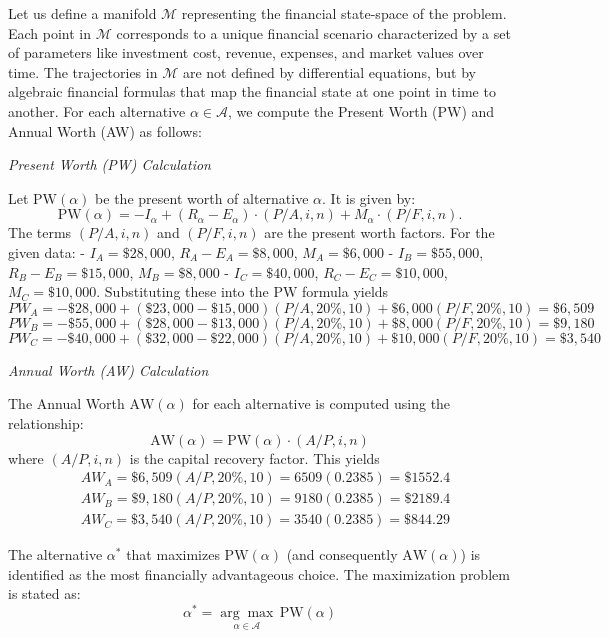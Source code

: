 \documentclass[12pt]{article}
\begin{document}
Let us define a manifold \(\mathcal{M}\) representing the financial state-space of the problem. Each point in \(\mathcal{M}\) corresponds to a unique financial scenario characterized by a set of parameters like investment cost, revenue, expenses, and market values over time. The trajectories in \(\mathcal{M}\) are not defined by differential equations, but by algebraic financial formulas that map the financial state at one point in time to another. For each alternative \(\alpha \in \mathcal{A}\), we compute the Present Worth (PW) and Annual Worth (AW) as follows:

\textit{Present Worth (PW) Calculation}

Let \(\text{PW}(\alpha)\) be the present worth of alternative \(\alpha\). It is given by: \[ \text{PW}(\alpha) = -I_\alpha + (R_\alpha - E_\alpha) \cdot (P/A, i, n) + M_\alpha \cdot (P/F, i, n). \] The terms \((P/A, i, n)\) and \((P/F, i, n)\) are the present worth factors. For the given data: - \(I_A = \$28,000\), \(R_A - E_A = \$8,000\), \(M_A = \$6,000\) - \(I_B = \$55,000\), \(R_B - E_B = \$15,000\), \(M_B = \$8,000\) - \(I_C = \$40,000\), \(R_C - E_C = \$10,000\), \(M_C = \$10,000\). Substituting these into the \(\text{PW}\) formula yields \[P W_A=-\$ 28,000+(\$ 23,000-\$ 15,000)(P / A, 20 \%, 10)+\$ 6,000(P / F, 20 \%, 10)=\$ 6,509\] \[P W_B=-\$ 55,000+(\$ 28,000-\$ 13,000)(P / A, 20 \%, 10)+\$ 8,000(P / F, 20 \%, 10)=\$ 9,180\] \[P W_C=-\$ 40,000+(\$ 32,000-\$ 22,000)(P / A, 20 \%, 10)+\$ 10,000(P / F, 20 \%, 10)=\$ 3,540\]

\textit{Annual Worth (AW) Calculation}

The Annual Worth \(\text{AW}(\alpha)\) for each alternative is computed using the relationship: \[ \text{AW}(\alpha) = \text{PW}(\alpha) \cdot (A/P, i, n) \] where \((A/P, i, n)\) is the capital recovery factor. This yields \[\begin{aligned} & A W_A=\$ 6,509(A / P, 20 \%, 10)=6509(0.2385)=\$ 1552.4 \\ & \boxed{A W_B=\$ 9,180(A / P, 20 \%, 10)=9180(0.2385)=\$ 2189.4} \\ & A W_C=\$ 3,540(A / P, 20 \%, 10)=3540(0.2385)=\$ 844.29 \end{aligned}\]
   

The alternative \(\alpha^*\) that maximizes \(\text{PW}(\alpha)\) (and consequently \(\text{AW}(\alpha)\)) is identified as the most financially advantageous choice. The maximization problem is stated as:
\[ \alpha^* = \underset{\alpha \in \mathcal{A}}{\arg\max} \, \text{PW}(\alpha) \]
\end{document}
